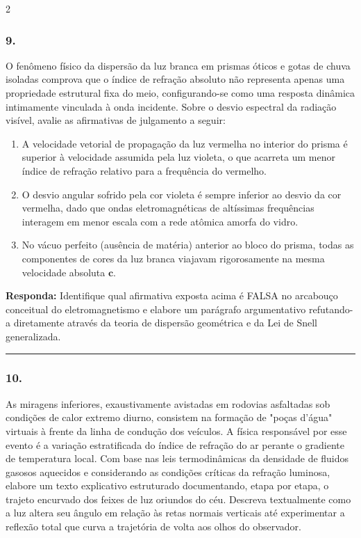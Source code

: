 \documentclass[twoside, 10pt, a4paper]{article}
\newlength{\espacoPreQuestao}\setlength{\espacoPreQuestao}{0.1cm}
\newlength{\espacoQuestao}\setlength{\espacoQuestao}{0.2cm}
\newlength{\espacoAlt}\setlength{\espacoAlt}{0.2cm}
\begin{document}
\begin{multicols*}{2}
\subsubsection*{9.} O fenômeno físico da dispersão da luz branca em prismas óticos e gotas de chuva isoladas comprova que o índice de refração absoluto não representa apenas uma propriedade estrutural fixa do meio, configurando-se como uma resposta dinâmica intimamente vinculada à onda incidente. Sobre o desvio espectral da radiação visível, avalie as afirmativas de julgamento a seguir:
\begin{enumerate}[label=\Roman*., itemsep=\espacoAlt]
\item A velocidade vetorial de propagação da luz vermelha no interior do prisma é superior à velocidade assumida pela luz violeta, o que acarreta um menor índice de refração relativo para a frequência do vermelho.
\item O desvio angular sofrido pela cor violeta é sempre inferior ao desvio da cor vermelha, dado que ondas eletromagnéticas de altíssimas frequências interagem em menor escala com a rede atômica amorfa do vidro.
\item No vácuo perfeito (ausência de matéria) anterior ao bloco do prisma, todas as componentes de cores da luz branca viajavam rigorosamente na mesma velocidade absoluta $ \textbf{c} $.
\end{enumerate}
\begin{boxresponda}
\textbf{Responda:} Identifique qual afirmativa exposta acima é FALSA no arcabouço conceitual do eletromagnetismo e elabore um parágrafo argumentativo refutando-a diretamente através da teoria de dispersão geométrica e da Lei de Snell generalizada.
\end{boxresponda}
\par\vspace{\espacoQuestao}

\noindent\textcolor{CorLinha}{\rule{\linewidth}{0.5pt}} 
\par\vspace{\espacoPreQuestao}
\subsubsection*{10.} As miragens inferiores, exaustivamente avistadas em rodovias asfaltadas sob condições de calor extremo diurno, consistem na formação de "poças d'água" virtuais à frente da linha de condução dos veículos. A física responsável por esse evento é a variação estratificada do índice de refração do ar perante o gradiente de temperatura local.
Com base nas leis termodinâmicas da densidade de fluidos gasosos aquecidos e considerando as condições críticas da refração luminosa, elabore um texto explicativo estruturado documentando, etapa por etapa, o trajeto encurvado dos feixes de luz oriundos do céu. Descreva textualmente como a luz altera seu ângulo em relação às retas normais verticais até experimentar a reflexão total que curva a trajetória de volta aos olhos do observador.
\par\vspace{\espacoQuestao}

\end{multicols*}
\end{document}
